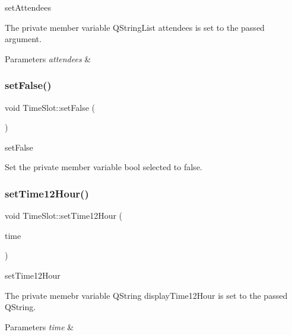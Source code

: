 set\+Attendees 

The private member variable Q\+String\+List attendees is set to the passed argument. 
\begin{DoxyParams}{Parameters}
{\em attendees} & \\
\hline
\end{DoxyParams}
\mbox{\label{class_time_slot_adb02c968ee765b49136f051a9ea43b06}} 
\subsubsection{\texorpdfstring{set\+False()}{setFalse()}}
{\footnotesize\ttfamily void Time\+Slot\+::set\+False (\begin{DoxyParamCaption}{ }\end{DoxyParamCaption})}



set\+False 

Set the private member variable bool selected to false. \mbox{\label{class_time_slot_a9b50d81d78b54b9127029e7fffba198b}} 
\subsubsection{\texorpdfstring{set\+Time12\+Hour()}{setTime12Hour()}}
{\footnotesize\ttfamily void Time\+Slot\+::set\+Time12\+Hour (\begin{DoxyParamCaption}\item[{Q\+String}]{time }\end{DoxyParamCaption})}



set\+Time12\+Hour 

The private memebr variable Q\+String display\+Time12\+Hour is set to the passed Q\+String. 
\begin{DoxyParams}{Parameters}
{\em time} & \\
\hline
\end{DoxyParams}
\mbox{\label{class_time_slot_aa095348bd53bd45ca4797181e6927ea4}} 
